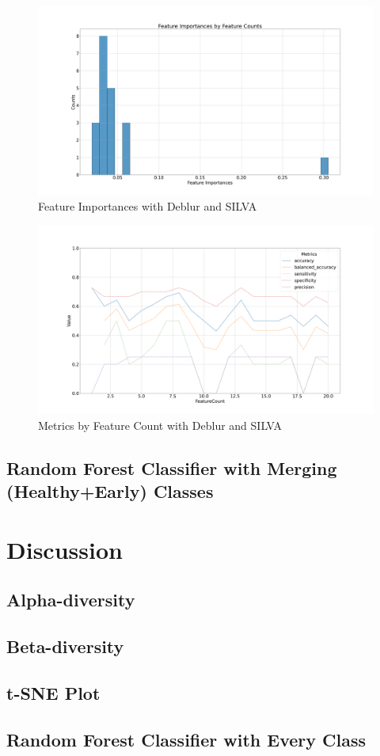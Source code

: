 \documentclass[a4paper]{article}
\begin{document}
                \begin{figure}[p]
                    \centering
                    \includegraphics[width=0.7 \linewidth]{figures/RandomForest/ANCOM.Deblur.silva/importances.png}
                    \caption{Feature Importances with Deblur and SILVA}
                    \label{fig:importances-Deblur-silva}
                \end{figure}

                \begin{figure}[p]
                    \centering
                    \includegraphics[width=0.7 \linewidth]{figures/RandomForest/ANCOM.Deblur.silva/metrics.png}
                    \caption{Metrics by Feature Count with Deblur and SILVA}
                    \label{fig:metrics-Deblur-silva}
                \end{figure}

        \subsection{Random Forest Classifier with Merging (Healthy+Early) Classes}

    \section{Discussion}
        \subsection{Alpha-diversity}

        \subsection{Beta-diversity}

        \subsection{t-SNE Plot}

        \subsection{Random Forest Classifier with Every Class}

    
    
\end{document}
